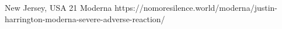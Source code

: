                 {
                  New Jersey, USA
                }
                {
                  21
                }
                {
                  Moderna
                }
                {
                }
                {           
                }
                {
                  https://nomoresilence.world/moderna/justin-harrington-moderna-severe-adverse-reaction/
                }



